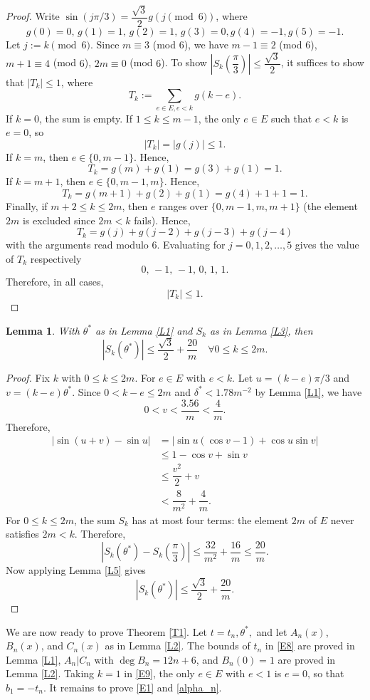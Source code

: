 \documentclass[a4paper,12pt,english,reqno]{amsart}
\newtheorem{lem}[thm]{Lemma}
\theoremstyle{definition}
\theoremstyle{remark}
\begin{document}
\begin{proof}
Write $\sin(j\pi/3)=\dfrac{\sqrt{3}}{2}g(j\pmod{6})$, where \[g(0)=0,\,g(1)=1,\,g(2)=1,\,g(3)=0,g(4)=-1,g(5)=-1.\]
Let $j:=k\pmod{6}$. Since $m\equiv 3$ (mod 6), we have $m-1\equiv 2$ (mod $6$), $m+1\equiv 4$ (mod $6$), $2m\equiv 0$ (mod $6$). To show $|S_k(\dfrac{\pi}{3})|\leq \dfrac{\sqrt{3}}{2}$, it suffices to show that $|T_k|\leq 1$, where  \[T_k:=\sum_{e\in E,e<k}g(k-e).\]
If $k=0$, the sum is empty. If $1\leq k\leq m-1$, the only $e\in E$ such that $e<k$ is $e=0$, so \[|T_k|=|g(j)|\leq 1.\]
If $k=m$, then $e\in \{0,m-1\}$. Hence, \[T_k=g(m)+g(1)=g(3)+g(1)=1.\]
If $k=m+1$, then $e\in \{0,m-1,m\}$. Hence, \[T_k=g(m+1)+g(2)+g(1)=g(4)+1+1=1.\]
Finally, if $m+2\leq k\leq 2m$, then $e$ ranges over $\{0,m-1,m,m+1\}$ (the element $2m$ is excluded since $2m<k$ fails). Hence, \[T_k=g(j)+g(j-2)+g(j-3)+g(j-4)\]
with the arguments read modulo 6. Evaluating for $j=0,1,2,\ldots,5$ gives the value of $T_k$ respectively \[0,\,-1,\,-1,\,0,\,1,\,1.\]
Therefore, in all cases, \[|T_k|\leq 1.\]
\end{proof}
\begin{lem}\label{L6}
With $\theta^*$ as in Lemma \ref{L1} and $S_k$ as in Lemma \ref{L3}, then \[|S_k(\theta^*)|\leq \dfrac{\sqrt{3}}{2}+\dfrac{20}{m}\quad\forall 0\leq k\leq 2m.\]
\end{lem}
\begin{proof}
Fix $k$ with $0\leq k\leq 2m$. For $e\in E$ with $e<k$. Let $u=(k-e)\pi/3$ and $v=(k-e)\theta^*$. Since $0<k-e\leq 2m$ and $\delta^*<1.78m^{-2}$ by Lemma \ref{L1}, we have \[0<v<\dfrac{3.56}{m}<\dfrac{4}{m}.\]
Therefore, \[\begin{split}|\sin(u+v)-\sin u|&=|\sin u(\cos v-1)+\cos u \sin v|\\
&\leq 1-\cos v+\sin v\\
&\leq \dfrac{v^2}{2}+v\\
&<\dfrac{8}{m^2}+\dfrac{4}{m}.\end{split}\]
For $0\leq k\leq 2m$, the sum $S_k$ has at most four terms: the element $2m$ of $E$ never satisfies $2m<k$. Therefore,
\[\left|S_k(\theta^*)-S_k(\dfrac{\pi}{3})\right|\leq \dfrac{32}{m^2}+\dfrac{16}{m}\leq \dfrac{20}{m}.\]
Now applying Lemma \ref{L5} gives \[|S_k(\theta^*)|\leq \dfrac{\sqrt{3}}{2}+\dfrac{20}{m}.\]
\end{proof}
We are now ready to prove Theorem \ref{T1}. Let $t=t_n,\theta^*,$ and let $A_n(x)$, $B_n(x)$, and $C_n(x)$ as in Lemma  \ref{L2}. The bounds of $t_n$ in \eqref{E8} are proved in Lemma \ref{L1}, $A_n|C_n$ with $\deg B_n=12n+6$, and $B_n(0)=1$ are proved in Lemma \ref{L2}. Taking $k=1$ in \eqref{E9}, the only $e\in E$ with $e<1$ is $e=0$, so that $b_1=-t_n$. It remains to prove \eqref{E1} and \eqref{alpha_n}.
\end{document}
